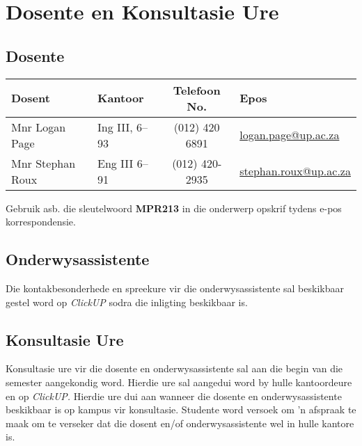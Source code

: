 \section{Dosente en Konsultasie Ure}
    \subsection{Dosente}
        \begin{table}[!h]
            \begin{center}
             \begin{tabular}{|l|l|c|l|}
                 \hline
                 {\bf Dosent} & {\bf Kantoor} & {\bf Telefoon No.} & {\bf Epos} \\
                 \hline
                 Mnr Logan Page &
                 Ing III, 6--93 &
                 (012) 420 6891 &
                 \href{mailto:logan.page@up.ac.za}{logan.page@up.ac.za} \\
                 Mnr Stephan Roux &
                 Eng III 6--91 &
                 (012) 420-2935 &
                 \href{mailto:stephan.roux@up.ac.za}{stephan.roux@up.ac.za} \\
                 \hline
             \end{tabular}
            \end{center}
        \end{table}

        Gebruik asb. die sleutelwoord \textbf{MPR213} in die onderwerp opskrif
        tydens e-pos korrespondensie.

    \subsection{Onderwysassistente}
        Die kontakbesonderhede en spreekure vir die onderwysassistente sal
        beskikbaar gestel word op \textit{ClickUP} sodra die inligting
        beskikbaar is.

    \subsection{Konsultasie Ure}
        Konsultasie ure vir die dosente en onderwysassistente sal aan die begin
        van die semester aangekondig word.  Hierdie ure sal aangedui word by
        hulle kantoordeure en op \textit{ClickUP.}  Hierdie ure dui aan wanneer
        die dosente en onderwysassistente beskikbaar is op kampus vir
        konsultasie.  Studente word versoek om 'n afspraak te maak om te
        verseker dat die dosent en/of onderwysassistente wel in hulle kantore
        is.

